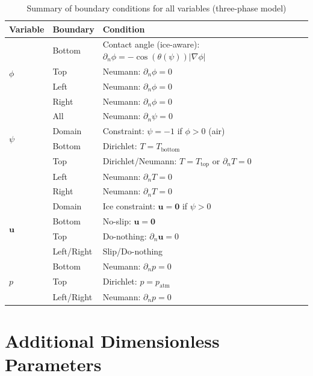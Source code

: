 \documentclass[12pt]{article}
\begin{document}
\begin{table}[h]
\centering
\begin{tabular}{|l|l|l|}
\hline
\textbf{Variable} & \textbf{Boundary} & \textbf{Condition} \\
\hline
\multirow{4}{*}{$\phi$} & Bottom & Contact angle (ice-aware): $\partial_n \phi = -\cos(\theta(\psi))|\nabla \phi|$ \\
 & Top & Neumann: $\partial_n \phi = 0$ \\
 & Left & Neumann: $\partial_n \phi = 0$ \\
 & Right & Neumann: $\partial_n \phi = 0$ \\
\hline
\multirow{4}{*}{$\psi$} & All & Neumann: $\partial_n \psi = 0$ \\
 & Domain & Constraint: $\psi = -1$ if $\phi > 0$ (air) \\
\hline
\multirow{4}{*}{$T$} & Bottom & Dirichlet: $T = T_{\text{bottom}}$ \\
 & Top & Dirichlet/Neumann: $T = T_{\text{top}}$ or $\partial_n T = 0$ \\
 & Left & Neumann: $\partial_n T = 0$ \\
 & Right & Neumann: $\partial_n T = 0$ \\
\hline
\multirow{4}{*}{$\mathbf{u}$} & Domain & Ice constraint: $\mathbf{u} = \mathbf{0}$ if $\psi > 0$ \\
 & Bottom & No-slip: $\mathbf{u} = \mathbf{0}$ \\
 & Top & Do-nothing: $\partial_n \mathbf{u} = 0$ \\
 & Left/Right & Slip/Do-nothing \\
\hline
\multirow{4}{*}{$p$} & Bottom & Neumann: $\partial_n p = 0$ \\
 & Top & Dirichlet: $p = p_{\text{atm}}$ \\
 & Left/Right & Neumann: $\partial_n p = 0$ \\
\hline
\end{tabular}
\caption{Summary of boundary conditions for all variables (three-phase model)}
\label{tab:boundary_conditions_three}
\end{table}

\section{Additional Dimensionless Parameters}
\end{document}
